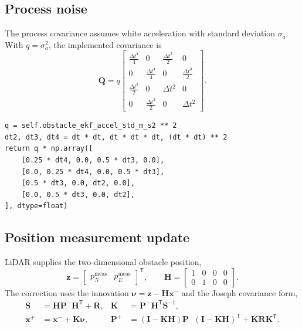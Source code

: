 \documentclass[11pt,a4paper]{article}
\begin{document}
\subsection{Process noise}

The process covariance assumes white acceleration with standard deviation
$\sigma_a$. With $q=\sigma_a^2$, the implemented covariance is
\begin{equation}
\bm{Q}=q\begin{bmatrix}
\frac{\Delta t^4}{4}&0&\frac{\Delta t^3}{2}&0\\
0&\frac{\Delta t^4}{4}&0&\frac{\Delta t^3}{2}\\
\frac{\Delta t^3}{2}&0&\Delta t^2&0\\
0&\frac{\Delta t^3}{2}&0&\Delta t^2
\end{bmatrix}.
\end{equation}

\begin{lstlisting}
q = self.obstacle_ekf_accel_std_m_s2 ** 2
dt2, dt3, dt4 = dt * dt, dt * dt * dt, (dt * dt) ** 2
return q * np.array([
    [0.25 * dt4, 0.0, 0.5 * dt3, 0.0],
    [0.0, 0.25 * dt4, 0.0, 0.5 * dt3],
    [0.5 * dt3, 0.0, dt2, 0.0],
    [0.0, 0.5 * dt3, 0.0, dt2],
], dtype=float)
\end{lstlisting}

\subsection{Position measurement update}

LiDAR supplies the two-dimensional obstacle position,
\begin{equation}
\bm{z}=\begin{bmatrix}p_N^{\mathrm{meas}}&p_E^{\mathrm{meas}}\end{bmatrix}^{\mathsf T},
\qquad
\bm{H}=\begin{bmatrix}1&0&0&0\\0&1&0&0\end{bmatrix}.
\end{equation}
The correction uses the innovation $\bm{\nu}=\bm{z}-\bm{H}\bm{x}^{-}$ and
the Joseph covariance form,
\begin{align}
\bm{S}&=\bm{H}\bm{P}^{-}\bm{H}^{\mathsf T}+\bm{R}, &
\bm{K}&=\bm{P}^{-}\bm{H}^{\mathsf T}\bm{S}^{-1},\\
\bm{x}^{+}&=\bm{x}^{-}+\bm{K}\bm{\nu}, &
\bm{P}^{+}&=(\bm{I}-\bm{K}\bm{H})\bm{P}^{-}(\bm{I}-\bm{K}\bm{H})^{\mathsf T}
+\bm{K}\bm{R}\bm{K}^{\mathsf T}.
\end{align}
\end{document}
